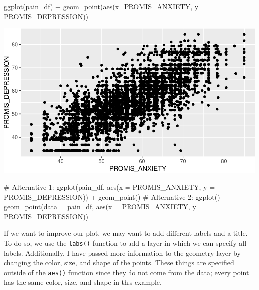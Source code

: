\documentclass[
  letterpaper,
]{latex/krantz}
\makeatletter
\newenvironment{Shaded}{\begin{snugshade}}{\end{snugshade}}
\newcommand{\AttributeTok}[1]{\textcolor[rgb]{0.40,0.45,0.13}{#1}}
\newcommand{\CommentTok}[1]{\textcolor[rgb]{0.37,0.37,0.37}{#1}}
\newcommand{\FunctionTok}[1]{\textcolor[rgb]{0.28,0.35,0.67}{#1}}
\newcommand{\NormalTok}[1]{\textcolor[rgb]{0.00,0.23,0.31}{#1}}
\newcommand{\SpecialCharTok}[1]{\textcolor[rgb]{0.37,0.37,0.37}{#1}}
\newenvironment{kframe}{%
\medskip{}
\setlength{\fboxsep}{.8em}
 \def\at@end@of@kframe{}%
 \ifinner\ifhmode%
  \def\at@end@of@kframe{\end{minipage}}%
  \begin{minipage}{\columnwidth}%
 \fi\fi%
 \def\FrameCommand##1{\hskip\@totalleftmargin \hskip-\fboxsep
 \colorbox{shadecolor}{##1}\hskip-\fboxsep
     \hskip-\linewidth \hskip-\@totalleftmargin \hskip\columnwidth}%
 \MakeFramed {\advance\hsize-\width
   \@totalleftmargin\z@ \linewidth\hsize
   \@setminipage}}%
 {\par\unskip\endMakeFramed%
 \at@end@of@kframe}
\renewenvironment{Shaded}{\begin{kframe}}{\end{kframe}}
\makeatother
\begin{document}
\begin{Shaded}
\begin{Highlighting}[]
\FunctionTok{ggplot}\NormalTok{(pain\_df) }\SpecialCharTok{+} \FunctionTok{geom\_point}\NormalTok{(}\FunctionTok{aes}\NormalTok{(}\AttributeTok{x=}\NormalTok{PROMIS\_ANXIETY, }
                                 \AttributeTok{y =}\NormalTok{ PROMIS\_DEPRESSION))}
\end{Highlighting}
\end{Shaded}

\begin{center}
\includegraphics[width=1\textwidth,height=\textheight]{book/visualization_ggplot_files/figure-pdf/unnamed-chunk-3-1.pdf}
\end{center}

\begin{Shaded}
\begin{Highlighting}[]
\CommentTok{\# Alternative 1:}
\FunctionTok{ggplot}\NormalTok{(pain\_df, }\FunctionTok{aes}\NormalTok{(}\AttributeTok{x =}\NormalTok{ PROMIS\_ANXIETY, }\AttributeTok{y =}\NormalTok{ PROMIS\_DEPRESSION)) }\SpecialCharTok{+} 
  \FunctionTok{geom\_point}\NormalTok{()}
\CommentTok{\# Alternative 2:}
\FunctionTok{ggplot}\NormalTok{() }\SpecialCharTok{+} 
  \FunctionTok{geom\_point}\NormalTok{(}\AttributeTok{data =}\NormalTok{ pain\_df, }\FunctionTok{aes}\NormalTok{(}\AttributeTok{x =}\NormalTok{ PROMIS\_ANXIETY, }
                                 \AttributeTok{y =}\NormalTok{ PROMIS\_DEPRESSION))}
\end{Highlighting}
\end{Shaded}

If we want to improve our plot, we may want to add different labels
 and a title. To do so, we use the
\texttt{labs()} function to
add a layer in which we can specify all labels. Additionally, I have
passed more information to the geometry layer by changing the color,
size, and shape of the points. These things are specified outside of the
\texttt{aes()} function since
they do not come from the data; every point has the same color, size,
and shape in this example.
\end{document}
